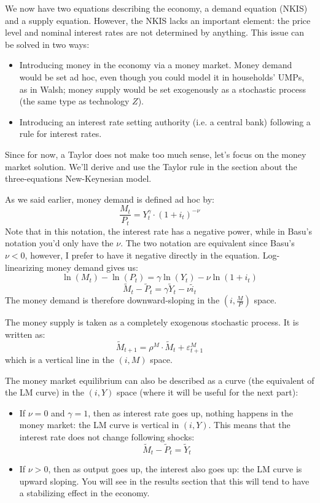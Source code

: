 \documentclass[12pt]{report}
\begin{document}
We now have two equations describing the economy, a demand equation (NKIS) and a supply equation. However, the NKIS lacks an important element: the price level and nominal interest rates are not determined by anything. This issue can be solved in two ways:\begin{itemize}
\item Introducing money in the economy via a money market. Money demand would be set ad hoc, even though you could model it in households' UMPs, as in Walsh; money supply would be set exogenously as a stochastic process (the same type as technology $Z$).
\item Introducing an interest rate setting authority (i.e. a central bank) following a rule for interest rates.
\end{itemize} Since for now, a Taylor does not make too much sense, let's focus on the money market solution. We'll derive and use the Taylor rule in the section about the three-equations New-Keynesian model.

As we said earlier, money demand is defined ad hoc by: $$\frac{M_t}{P_t} = Y_t^\gamma \cdot (1 + i_t)^{-\nu} $$ Note that in this notation, the interest rate has a negative power, while in Basu's notation you'd only have the $\nu$. The two notation are equivalent since Basu's $\nu <0$, however, I prefer to have it negative directly in the equation. Log-linearizing money demand gives us: $$\ln(M_t) - \ln(P_t) = \gamma \ln(Y_t) - \nu \ln(1+i_t) $$ $$\tilde M_t - \tilde P_t = \gamma \tilde Y_t - \nu \tilde i_t $$ The money demand is therefore downward-sloping in the $(i, \frac{M}{P})$ space.

The money supply is taken as a completely exogenous stochastic process. It is written as: $$\tilde M_{t+1} = \rho^M \cdot \tilde M_t + \varepsilon_{t+1}^M $$ which is a vertical line in the $(i, M)$ space.

The money market equilibrium can also be described as a curve (the equivalent of the LM curve) in the $(i, Y)$ space (where it will be useful for the next part):\begin{itemize}
\item If $\nu = 0$ and $\gamma = 1$, then as interest rate goes up, nothing happens in the money market: the LM curve is vertical in $(i, Y)$. This means that the interest rate does not change following shocks: $$\tilde M_t - \tilde P_t = \tilde Y_t $$
\item If $\nu > 0$, then as output goes up, the interest also goes up: the LM curve is upward sloping. You will see in the results section that this will tend to have a stabilizing effect in the economy.
\end{itemize}
\end{document}
